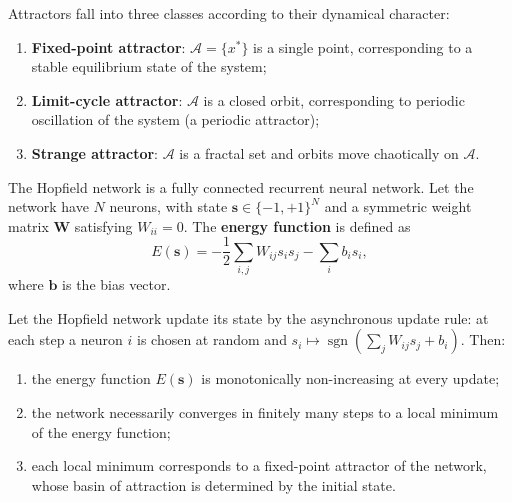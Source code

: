 \begin{definition}\label{def:attractor_types}
Attractors fall into three classes according to their dynamical character:
\begin{enumerate}[label=(\roman*)]
    \item \textbf{Fixed-point attractor}: $\mathcal{A}=\{x^*\}$ is a single point, corresponding to a stable equilibrium state of the system;
    \item \textbf{Limit-cycle attractor}: $\mathcal{A}$ is a closed orbit, corresponding to periodic oscillation of the system (a periodic attractor);
    \item \textbf{Strange attractor}: $\mathcal{A}$ is a fractal set and orbits move chaotically on $\mathcal{A}$.
\end{enumerate}
\end{definition}

\begin{definition}\label{def:hopfield_energy}
The Hopfield network is a fully connected recurrent neural network. Let the network have $N$ neurons, with state $\mathbf{s}\in\{-1,+1\}^N$ and a symmetric weight matrix $\mathbf{W}$ satisfying $W_{ii}=0$. The \textbf{energy function} is defined as
\[
E(\mathbf{s})=-\frac{1}{2}\sum_{i,j}W_{ij}s_is_j-\sum_i b_is_i,
\]
where $\mathbf{b}$ is the bias vector.
\end{definition}

\begin{theorem}\label{thm:hopfield_convergence}
Let the Hopfield network update its state by the asynchronous update rule: at each step a neuron $i$ is chosen at random and $s_i\mapsto\operatorname{sgn}(\sum_jW_{ij}s_j+b_i)$. Then:
\begin{enumerate}[label=(\roman*)]
    \item the energy function $E(\mathbf{s})$ is monotonically non-increasing at every update;
    \item the network necessarily converges in finitely many steps to a local minimum of the energy function;
    \item each local minimum corresponds to a fixed-point attractor of the network, whose basin of attraction is determined by the initial state.
\end{enumerate}
\end{theorem}

